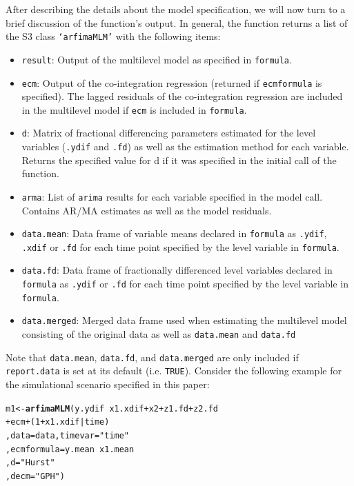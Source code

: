 \documentclass[12pt]{paper}\usepackage[]{graphicx}\usepackage[]{color}
\makeatletter
\newcommand{\hlnum}[1]{\textcolor[rgb]{0.686,0.059,0.569}{#1}}%
\newcommand{\hlstr}[1]{\textcolor[rgb]{0.192,0.494,0.8}{#1}}%
\newcommand{\hlopt}[1]{\textcolor[rgb]{0,0,0}{#1}}%
\newcommand{\hlstd}[1]{\textcolor[rgb]{0.345,0.345,0.345}{#1}}%
\newcommand{\hlkwb}[1]{\textcolor[rgb]{0.69,0.353,0.396}{#1}}%
\newcommand{\hlkwc}[1]{\textcolor[rgb]{0.333,0.667,0.333}{#1}}%
\newcommand{\hlkwd}[1]{\textcolor[rgb]{0.737,0.353,0.396}{\textbf{#1}}}%
\newenvironment{kframe}{%
 \def\at@end@of@kframe{}%
 \ifinner\ifhmode%
  \def\at@end@of@kframe{\end{minipage}}%
  \begin{minipage}{\columnwidth}%
 \fi\fi%
 \def\FrameCommand##1{\hskip\@totalleftmargin \hskip-\fboxsep
 \colorbox{shadecolor}{##1}\hskip-\fboxsep
     \hskip-\linewidth \hskip-\@totalleftmargin \hskip\columnwidth}%
 \MakeFramed {\advance\hsize-\width
   \@totalleftmargin\z@ \linewidth\hsize
   \@setminipage}}%
 {\par\unskip\endMakeFramed%
 \at@end@of@kframe}
\newenvironment{knitrout}{}{} %
\makeatother
\begin{document}
After describing the details about the model specification, we will now turn to a brief discussion of the function's output. In general, the function returns a list of the S3 class \texttt{`arfimaMLM'} with the following items:
\begin{itemize}
\item \texttt{result}: Output of the multilevel model as specified in \texttt{formula}.
\item \texttt{ecm}: Output of the co-integration regression (returned if \texttt{ecmformula} is specified). The lagged residuals of the co-integration regression are included in the multilevel model if \texttt{ecm} is included in \texttt{formula}.
\item \texttt{d}: Matrix of fractional differencing parameters estimated for the level variables (\texttt{.ydif} and \texttt{.fd}) as well as the estimation method for each variable. Returns the specified value for d if it was specified in the initial call of the function.
\item \texttt{arma}: List of \texttt{arima} results for each variable specified in the model call. Contains AR/MA estimates as well as the model residuals.
\item \texttt{data.mean}: Data frame of variable means declared in \texttt{formula} as \texttt{.ydif}, \texttt{.xdif} or \texttt{.fd} for each time point specified by the level variable in \texttt{formula}.
\item \texttt{data.fd}: Data frame of fractionally differenced level variables declared in \texttt{formula} as \texttt{.ydif} or \texttt{.fd} for each time point specified by the level variable in \texttt{formula}.
\item \texttt{data.merged}: Merged data frame used when estimating the multilevel model consisting of the original data as well as \texttt{data.mean} and \texttt{data.fd}
\end{itemize}

Note that \texttt{data.mean}, \texttt{data.fd}, and \texttt{data.merged} are only included if \texttt{report.data} is set at its default (i.e. \texttt{TRUE}). Consider the following example for the simulational scenario specified in this paper:

\begin{knitrout}
\color{fgcolor}\begin{kframe}
\begin{alltt}
\hlstd{m1} \hlkwb{<-} \hlkwd{arfimaMLM}\hlstd{(y.ydif} \hlopt{~} \hlstd{x1.xdif} \hlopt{+} \hlstd{x2} \hlopt{+} \hlstd{z1.fd} \hlopt{+} \hlstd{z2.fd}
                \hlopt{+} \hlstd{ecm} \hlopt{+} \hlstd{(}\hlnum{1}\hlopt{+}\hlstd{x1.xdif}\hlopt{|}\hlstd{time)}
                \hlstd{,} \hlkwc{data} \hlstd{= data,} \hlkwc{timevar} \hlstd{=} \hlstr{"time"}
                \hlstd{,} \hlkwc{ecmformula} \hlstd{= y.mean} \hlopt{~} \hlstd{x1.mean}
                \hlstd{,} \hlkwc{d} \hlstd{=} \hlstr{"Hurst"}
                \hlstd{,} \hlkwc{decm} \hlstd{=} \hlstr{"GPH"}\hlstd{)}
\end{alltt}
\end{kframe}
\end{knitrout}
\end{document}
